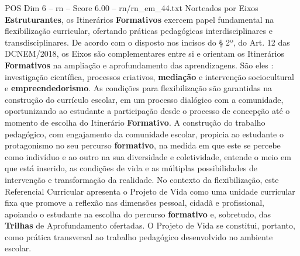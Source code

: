 \begin{textsample}{POS Dim 6 – rn – Score 6.00 – rn/rn\_em\_44.txt}
Norteados por Eixos \textbf{Estruturantes}, os Itinerários \textbf{Formativos} exercem papel fundamental na flexibilização curricular, ofertando práticas pedagógicas interdisciplinares e transdisciplinares.
De acordo com o disposto nos incisos do § 2º, do Art. 12 das DCNEM/2018, os Eixos são complementares entre si e orientam os Itinerários \textbf{Formativos} na ampliação e aprofundamento das aprendizagens.
São eles : investigação científica, processos criativos, \textbf{mediação} e intervenção sociocultural e \textbf{empreendedorismo}.
As condições para flexibilização são garantidas na construção do currículo escolar, em um processo dialógico com a comunidade, oportunizando ao estudante a participação desde o processo de concepção até o momento de escolha do Itinerário \textbf{Formativo}.
A construção do trabalho pedagógico, com engajamento da comunidade escolar, propicia ao estudante o protagonismo no seu percurso \textbf{formativo}, na medida em que este se percebe como indivíduo e ao outro na sua diversidade e coletividade, entende o meio em que está inserido, as condições de vida e as múltiplas possibilidades de intervenção e transformação da realidade.
No contexto da flexibilização, este Referencial Curricular apresenta o Projeto de Vida como uma unidade curricular fixa que promove a reflexão nas dimensões pessoal, cidadã e profissional, apoiando o estudante na escolha do percurso \textbf{formativo} e, sobretudo, das \textbf{Trilhas} de Aprofundamento ofertadas.
O Projeto de Vida se constitui, portanto, como prática transversal ao trabalho pedagógico desenvolvido no ambiente escolar.

\end{textsample}
